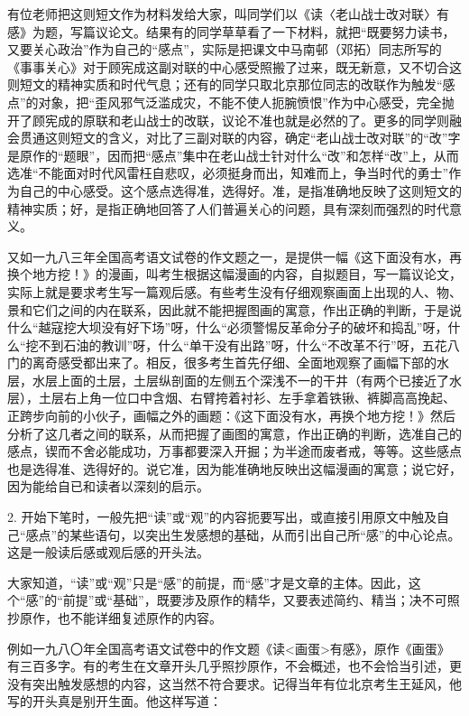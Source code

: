 有位老师把这则短文作为材料发给大家，叫同学们以《读〈老山战士改对联〉有感》为题，写篇议论文。结果有的同学草草看了一下材料，就把“既要努力读书，又要关心政治”作为自己的“感点”，实际是把课文中马南邨（邓拓）同志所写的《事事关心》对于顾宪成这副对联的中心感受照搬了过来，既无新意，又不切合这则短文的精神实质和时代气息；还有的同学只取北京那位同志的改联作为触发“感点”的对象，把“歪风邪气泛滥成灾，不能不使人扼腕愤恨”作为中心感受，完全抛开了顾宪成的原联和老山战士的改联，议论不准也就是必然的了。更多的同学则融会贯通这则短文的含义，对比了三副对联的内容，确定“老山战士改对联”的“改”字是原作的“题眼”，因而把“感点”集中在老山战士针对什么“改”和怎样“改”上，从而选准“不能面对时代风雷枉自悲叹，必须挺身而出，知难而上，争当时代的勇士”作为自己的中心感受。这个感点选得准，选得好。准，是指准确地反映了这则短文的精神实质；好，是指正确地回答了人们普遍关心的问题，具有深刻而强烈的时代意义。

又如一九八三年全国高考语文试卷的作文题之一，是提供一幅《这下面没有水，再换个地方挖！》的漫画，叫考生根据这幅漫画的内容，自拟题目，写一篇议论文，实际上就是要求考生写一篇观后感。有些考生没有仔细观察画面上出现的人、物、景和它们之间的内在联系，因此就不能把握图画的寓意，作出正确的判断，于是说什么“越寇挖大坝没有好下场”呀，什么“必须警惕反革命分子的破坏和捣乱”呀，什么“挖不到石油的教训”呀，什么“单干没有出路”呀，什么“不改革不行”呀，五花八门的离奇感受都出来了。相反，很多考生首先仔细、全面地观察了画幅下部的水层，水层上面的土层，土层纵剖面的左侧五个深浅不一的干井（有两个已接近了水层），土层右上角一位口中含烟、右臂挎着衬衫、左手拿着铁锹、裤脚高高挽起、正跨步向前的小伙子，画幅之外的画题：《这下面没有水，再换个地方挖！》然后分析了这几者之间的联系，从而把握了画图的寓意，作出正确的判断，选准自己的感点，锲而不舍必能成功，万事都要深入开掘；为半途而废者戒，等等。这些感点也是选得准、选得好的。说它准，因为能准确地反映出这幅漫画的寓意；说它好，因为能给自已和读者以深刻的启示。

2. 开始下笔时，一般先把“读”或“观”的内容扼要写出，或直接引用原文中触及自己“感点”的某些语句，以突出生发感想的基础，从而引出自己所“感”的中心论点。这是一般读后感或观后感的开头法。

大家知道，“读”或“观”只是“感”的前提，而“感”才是文章的主体。因此，这个“感”的“前提”或“基础”，既要涉及原作的精华，又要表述简约、精当；决不可照抄原作，也不能详细复述原作的内容。

例如一九八〇年全国高考语文试卷中的作文题《读<画蛋>有感》，原作《画蛋》有三百多字。有的考生在文章开头几乎照抄原作，不会概述，也不会恰当引述，更没有突出触发感想的内容，这当然不符合要求。记得当年有位北京考生王延风，他写的开头真是别开生面。他这样写道：

